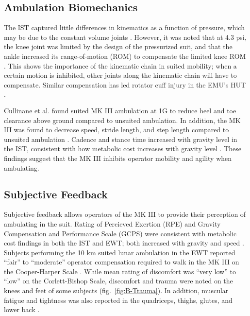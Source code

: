 \documentclass[defaultstyle,11pt]{thesis}
\begin{document}
\hypertarget{ambulation-biomechanics}{%
\subsection{Ambulation Biomechanics}\label{ambulation-biomechanics}}

The IST captured little differences in kinematics as a function of pressure, which may be due to the constant volume joints \citep{Norcross2010}.
However, it was noted that at 4.3 psi, the knee joint was limited by the design of the pressurized suit, and that the ankle increased its range-of-motion (ROM) to compensate the limited knee ROM \citep{Norcross2010}.
This shows the importance of the kinematic chain in suited mobility; when a certain motion is inhibited, other joints along the kinematic chain will have to compensate.
Similar compensation has led rotator cuff injury in the EMU's HUT \citep{Williams2003}.

Cullinane et al. \citep{Cullinane2017a} found suited MK III ambulation at 1G to reduce heel and toe clearance above ground compared to unsuited ambulation.
In addition, the MK III was found to decrease speed, stride length, and step length compared to unsuited ambulation \citep{Cullinane2017a}.
Cadence and stance time increased with gravity level in the IST, consistent with how metabolic cost increases with gravity level \citep{Norcross2010}.
These findings suggest that the MK III inhibits operator mobility and agility when ambulating.

\hypertarget{subjective-feedback}{%
\subsection{Subjective Feedback}\label{subjective-feedback}}

Subjective feedback allows operators of the MK III to provide their perception of ambulating in the suit.
Rating of Percieved Exertion (RPE) and Gravity Compensation and Performance Scale (GCPS) were consistent with metabolic cost findings in both the IST and EWT; both increased with gravity and speed \citep{Norcross2009, Norcross2010}.
Subjects performing the 10 km suited lunar ambulation in the EWT reported ``fair'' to ``moderate'' operator compensation required to walk in the MK III on the Cooper-Harper Scale \citep{Norcross2009}.
While mean rating of discomfort was ``very low'' to ``low'' on the Corlett-Bishop Scale, discomfort and trauma were noted on the knees and feet of some subjects \citep{Norcross2009} (fig.~\ref{fig:B-Trauma}).
In addition, muscular fatigue and tightness was also reported in the quadriceps, thighs, glutes, and lower back \citep{Norcross2009}.
\end{document}
